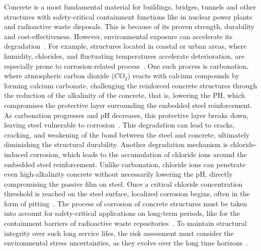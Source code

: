 
Concrete is a most fundamental material for buildings, bridges, tunnels and other structures with safety-critical containment functions like in nuclear power plants and radioactive waste disposals.
This is because of its proven strength, durability and cost-effectiveness.
However, environmental exposure can accelerate its degradation~\cite{GLASSER2008226}. For example, structures located in coastal or urban areas, where humidity, chlorides, and fluctuating temperatures accelerate deterioration, are especially prone to corrosion-related process~\cite{qu2021durability}.
One such process is carbonation, where atmospheric carbon dioxide ($CO_2$) reacts with calcium compounds by forming calcium carbonate, challenging the reinforced concrete structures through the reduction of the alkalinity of the concrete, that is, lowering the PH, which compromises the protective layer surrounding the embedded steel reinforcement.
As carbonation progresses and pH decreases, this protective layer breaks down, leaving steel vulnerable to corrosion~\cite{carbonation}.
This degradation can lead to cracks, cracking, and weakening of the bond between the steel and concrete, ultimately diminishing the structural durability.
Another degradation mechanism is chloride-induced corrosion, which leads to the accumulation of chloride ions around the embedded steel reinforcement. Unlike carbonation, chloride ions can penetrate even high-alkalinity concrete without necessarily lowering the pH, directly compromising the passive film on steel.
Once a critical chloride concentration threshold is reached on the steel surface, localized corrosion begins, often in the form of pitting~\cite{shi2012durability}.
The process of corrosion of concrete structures must be taken into account for safety-critical applications on long-term periods, like for the containment barriers of radioactive waste repositories~\cite{walton1990models}.
To maintain structural integrity over such long service lifes, the risk assessment must consider the environmental stress uncertainties, as they evolve over the long time horizons~\cite{lindborg2018climate}.
\\

